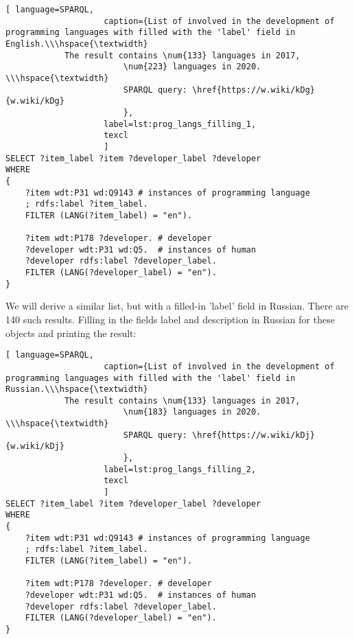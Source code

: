 \begin{lstlisting}[ language=SPARQL, 
                    caption={List of involved in the development of programming languages with filled with the 'label' field in English.\\\hspace{\textwidth}
			The result contains \num{133} languages in 2017, 
                        \num{223} languages in 2020. \\\hspace{\textwidth}
                        SPARQL query: \href{https://w.wiki/kDg}{w.wiki/kDg}
                        },
                    label=lst:prog_langs_filling_1,
                    texcl 
                    ]
SELECT ?item_label ?item ?developer_label ?developer
WHERE
{
    ?item wdt:P31 wd:Q9143 # instances of programming language
    ; rdfs:label ?item_label. 
    FILTER (LANG(?item_label) = "en"). 

    ?item wdt:P178 ?developer. # developer 
    ?developer wdt:P31 wd:Q5.  # instances of human
    ?developer rdfs:label ?developer_label. 
    FILTER (LANG(?developer_label) = "en").  
}
\end{lstlisting}%

We will derive a similar list, but with a filled-in 'label' field in Russian. There are 140 such results. Filling in the fields label and description in Russian for these objects and printing the result:

\begin{lstlisting}[ language=SPARQL, 
                    caption={List of involved in the development of programming languages with filled with the 'label' field in Russian.\\\hspace{\textwidth}
			The result contains \num{133} languages in 2017, 
                        \num{183} languages in 2020. \\\hspace{\textwidth}
                        SPARQL query: \href{https://w.wiki/kDj}{w.wiki/kDj}
                        },
                    label=lst:prog_langs_filling_2,
                    texcl 
                    ]
SELECT ?item_label ?item ?developer_label ?developer
WHERE
{
    ?item wdt:P31 wd:Q9143 # instances of programming language
    ; rdfs:label ?item_label. 
    FILTER (LANG(?item_label) = "en"). 

    ?item wdt:P178 ?developer. # developer 
    ?developer wdt:P31 wd:Q5.  # instances of human
    ?developer rdfs:label ?developer_label. 
    FILTER (LANG(?developer_label) = "en").  
}
\end{lstlisting}%